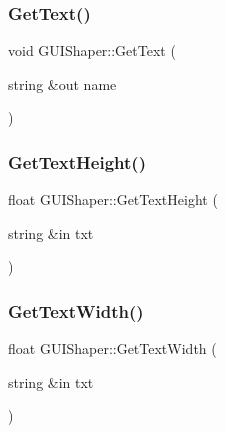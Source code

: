 \hypertarget{class_g_u_i_shaper_a9ad448bbdc1db9cd862e027e85852b0c}{}\label{class_g_u_i_shaper_a9ad448bbdc1db9cd862e027e85852b0c} 
\subsubsection{\texorpdfstring{Get\+Text()}{GetText()}}
{\footnotesize\ttfamily void G\+U\+I\+Shaper\+::\+Get\+Text (\begin{DoxyParamCaption}\item[{string \&out}]{name }\end{DoxyParamCaption})}

\hypertarget{class_g_u_i_shaper_a0cb4fdbdad444d19aa6fd913d9b39fe7}{}\label{class_g_u_i_shaper_a0cb4fdbdad444d19aa6fd913d9b39fe7} 
\subsubsection{\texorpdfstring{Get\+Text\+Height()}{GetTextHeight()}}
{\footnotesize\ttfamily float G\+U\+I\+Shaper\+::\+Get\+Text\+Height (\begin{DoxyParamCaption}\item[{string \&in}]{txt }\end{DoxyParamCaption})}

\hypertarget{class_g_u_i_shaper_a323e2a9bce3271863b23f49a0228f69e}{}\label{class_g_u_i_shaper_a323e2a9bce3271863b23f49a0228f69e} 
\subsubsection{\texorpdfstring{Get\+Text\+Width()}{GetTextWidth()}}
{\footnotesize\ttfamily float G\+U\+I\+Shaper\+::\+Get\+Text\+Width (\begin{DoxyParamCaption}\item[{string \&in}]{txt }\end{DoxyParamCaption})}

\hypertarget{class_g_u_i_shaper_afdd4c4a801b3cd09a39890a08841e47b}{}\label{class_g_u_i_shaper_afdd4c4a801b3cd09a39890a08841e47b} 
